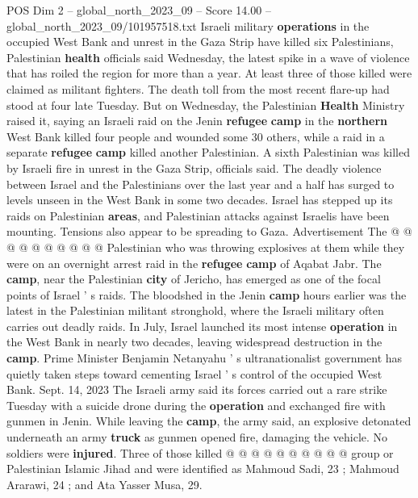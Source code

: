 \begin{textsample}{POS Dim 2 – global\_north\_2023\_09 – Score 14.00 – global\_north\_2023\_09/101957518.txt}  \label{ex:f2_pos_372}
Israeli military \textbf{operations} in the occupied West Bank and unrest in the Gaza Strip have killed six Palestinians, Palestinian \textbf{health} officials said Wednesday, the latest spike in a wave of violence that has roiled the region for more than a year.
At least three of those killed were claimed as militant fighters.
The death toll from the most recent flare-up had stood at four late Tuesday.
But on Wednesday, the Palestinian \textbf{Health} Ministry raised it, saying an Israeli raid on the Jenin \textbf{refugee} \textbf{camp} in the \textbf{northern} West Bank killed four people and wounded some 30 others, while a raid in a separate \textbf{refugee} \textbf{camp} killed another Palestinian.
A sixth Palestinian was killed by Israeli fire in unrest in the Gaza Strip, officials said.
The deadly violence between Israel and the Palestinians over the last year and a half has surged to levels unseen in the West Bank in some two decades.
Israel has stepped up its raids on Palestinian \textbf{areas}, and Palestinian attacks against Israelis have been mounting.
Tensions also appear to be spreading to Gaza.
Advertisement The @ @ @ @ @ @ @ @ @ @ Palestinian who was throwing explosives at them while they were on an overnight arrest raid in the \textbf{refugee} \textbf{camp} of Aqabat Jabr.
The \textbf{camp}, near the Palestinian \textbf{city} of Jericho, has emerged as one of the focal points of Israel ' s raids.
The bloodshed in the Jenin \textbf{camp} hours earlier was the latest in the Palestinian militant stronghold, where the Israeli military often carries out deadly raids.
In July, Israel launched its most intense \textbf{operation} in the West Bank in nearly two decades, leaving widespread destruction in the \textbf{camp}.
Prime Minister Benjamin Netanyahu ' s ultranationalist government has quietly taken steps toward cementing Israel ' s control of the occupied West Bank.
Sept. 14, 2023 The Israeli army said its forces carried out a rare strike Tuesday with a suicide drone during the \textbf{operation} and exchanged fire with gunmen in Jenin.
While leaving the \textbf{camp}, the army said, an explosive detonated underneath an army \textbf{truck} as gunmen opened fire, damaging the vehicle.
No soldiers were \textbf{injured}.
Three of those killed @ @ @ @ @ @ @ @ @ @ group or Palestinian Islamic Jihad and were identified as Mahmoud Sadi, 23 ; Mahmoud Ararawi, 24 ; and Ata Yasser Musa, 29.

\end{textsample}
